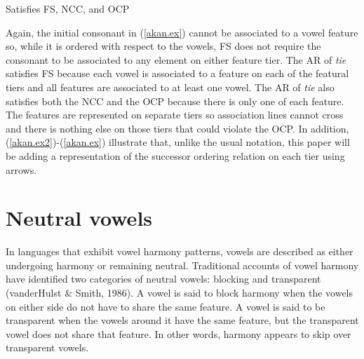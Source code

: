 \documentclass[,doc,floatsintext]{apa6}
\theoremstyle{definition}
\theoremstyle{definition}
\theoremstyle{definition}
\theoremstyle{remark}
\begin{document}
\begin{exe}
\ex \label{akan.ex} Satisfies FS, NCC, and OCP \\
\end{exe}

Again, the initial consonant in (\ref{akan.ex}) cannot be associated to
a vowel feature so, while it is ordered with respect to the vowels, FS
does not require the consonant to be associated to any element on either
feature tier. The AR of \emph{tie} satisfies FS because each vowel is
associated to a feature on each of the featural tiers and all features
are associated to at least one vowel. The AR of \emph{tie} also
satisfies both the NCC and the OCP because there is only one of each
feature. The features are represented on separate tiers so association
lines cannot cross and there is nothing else on those tiers that could
violate the OCP. In addition, (\ref{akan.ex2})-(\ref{akan.ex})
illustrate that, unlike the usual notation, this paper will be adding a
representation of the successor ordering relation on each tier using
arrows.

\section{Neutral vowels}\label{neutral-vowels}

In languages that exhibit vowel harmony patterns, vowels are described
as either undergoing harmony or remaining neutral. Traditional accounts
of vowel harmony have identified two categories of neutral vowels:
blocking and transparent (vanderHulst \& Smith, 1986). A vowel is said
to block harmony when the vowels on either side do not have to share the
same feature. A vowel is said to be transparent when the vowels around
it have the same feature, but the transparent vowel does not share that
feature. In other words, harmony appears to skip over transparent
vowels.
\end{document}
